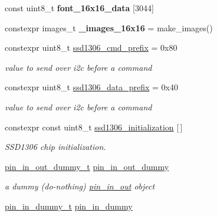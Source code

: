 \begin{DoxyCompactItemize}
const uint8\+\_\+t {\bfseries font\+\_\+16x16\+\_\+data} \mbox{[}3044\mbox{]}
\item 
\mbox{\label{namespacehwlib_a06e20968ae838a64c37847d1e56e449a}} 
constexpr images\+\_\+t {\bfseries \+\_\+images\+\_\+16x16} = make\+\_\+images()
\item 
\mbox{\label{namespacehwlib_a91ba83b9f601b9e5a9d870a7355cd234}} 
constexpr uint8\+\_\+t \hyperlink{namespacehwlib_a91ba83b9f601b9e5a9d870a7355cd234}{ssd1306\+\_\+cmd\+\_\+prefix} = 0x80
\begin{DoxyCompactList}\small\item\em value to send over i2c before a command \end{DoxyCompactList}\item 
\mbox{\label{namespacehwlib_a7a3622c80f998f1fd9e27f9e07e8f55c}} 
constexpr uint8\+\_\+t \hyperlink{namespacehwlib_a7a3622c80f998f1fd9e27f9e07e8f55c}{ssd1306\+\_\+data\+\_\+prefix} = 0x40
\begin{DoxyCompactList}\small\item\em value to send over i2c before a command \end{DoxyCompactList}\item 
constexpr const uint8\+\_\+t \hyperlink{namespacehwlib_ab32aa8b496b969a1ae47bab09a2c2937}{ssd1306\+\_\+initialization} \mbox{[}$\,$\mbox{]}
\begin{DoxyCompactList}\small\item\em S\+S\+D1306 chip initialization. \end{DoxyCompactList}\item 
\mbox{\label{namespacehwlib_a31dffd2fd7fac67f296449c4fa28b12a}} 
\hyperlink{classhwlib_1_1pin__in__out__dummy__t}{pin\+\_\+in\+\_\+out\+\_\+dummy\+\_\+t} \hyperlink{namespacehwlib_a31dffd2fd7fac67f296449c4fa28b12a}{pin\+\_\+in\+\_\+out\+\_\+dummy}
\begin{DoxyCompactList}\small\item\em a dummy (do-\/nothing) \hyperlink{classhwlib_1_1pin__in__out}{pin\+\_\+in\+\_\+out} object \end{DoxyCompactList}\item 
\mbox{\label{namespacehwlib_a5525c01598961cadd66dbed9186c08fb}} 
\hyperlink{classhwlib_1_1pin__in__dummy__t}{pin\+\_\+in\+\_\+dummy\+\_\+t} \hyperlink{namespacehwlib_a5525c01598961cadd66dbed9186c08fb}{pin\+\_\+in\+\_\+dummy}

\end{DoxyCompactItemize}
